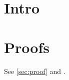 \documentclass[twocolumn,unicode]{wrapper}
\begin{document}
\wrapperclass\articleclass\layoutmode\hypermode
\tableofcontents
\section{Intro}
\appendix
\section{Proofs}\label{sec:proof}
See \autoref{sec:proof} and .
\end{document}
